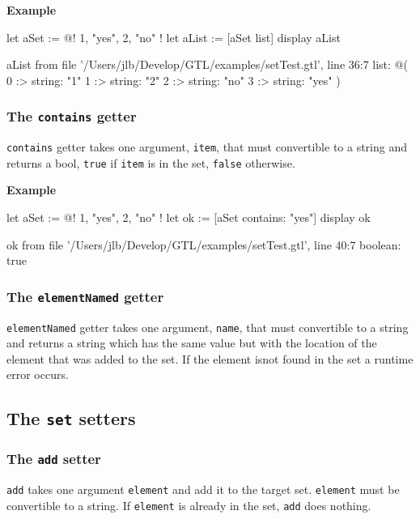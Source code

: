 \documentclass[10pt,openright,twosides,final]{memoir}
\newcommand{\gtlinline}[1]{\colorbox{light-blue}{\lstinline[language=gtl]{#1}}}
\newcommand{\example}{\vspace{.75em}\noindent\textbf{Example}\vspace{0em}}
\begin{document}
\example
\begin{gtl}
let aSet := @! 1, "yes", 2, "no" !
let aList := [aSet list]
display aList
\end{gtl}
\begin{console}
aList from file '/Users/jlb/Develop/GTL/examples/setTest.gtl', line 36:7
    list: @(
        0 :>
            string: "1"
        1 :>
            string: "2"
        2 :>
            string: "no"
        3 :>
            string: "yes"
    )
\end{console}

\subsubsection{The \texttt{contains} getter}

\gtlinline{contains} getter takes one argument, \gtlinline{item}, that must convertible to a string and returns a bool, \gtlinline{true} if \gtlinline{item} is in the set, \gtlinline{false} otherwise.

\example
\begin{gtl}
let aSet := @! 1, "yes", 2, "no" !
let ok := [aSet contains: "yes"]
display ok
\end{gtl}
\begin{console}
ok from file '/Users/jlb/Develop/GTL/examples/setTest.gtl', line 40:7
    boolean: true
\end{console}

\subsubsection{The \texttt{elementNamed} getter}

\gtlinline{elementNamed} getter takes one argument, \gtlinline{name}, that must convertible to a string and returns a string which has the same value but with the location of the element that was added to the set. If the element isnot found in the set a runtime error occurs.

\subsection{The \texttt{set} setters}

\subsubsection{The \texttt{add} setter}

\gtlinline{add} takes one argument \gtlinline{element} and add it to the target set. \gtlinline{element} must be convertible to a string. If \gtlinline{element} is already in the set, \gtlinline{add} does nothing.
\end{document}
